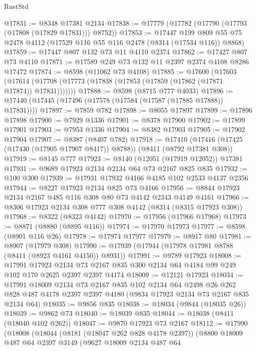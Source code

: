 \begin{lexlean}{RustStd}
\begin{coremodule}
@17831 := @8348 @17381 @2134
@17838 := @17779 (@17782 (@17790 (@17793 (@17808 (@17829 @17831))) @8752))
@17853 := @17447
    @199
    @809
    @55
    @75
    @2478
    @4112
    (@17529 @116 @55 @116 @2478 (@8314 (@17534 @116)) @8868)
@17859 := @17447 @807 @132 @73 @11 @4110 @2374
@17862 := @17427 @807 @73 @4110
@17871 := @17589 @249 @73 @132 @11 @2397 @2374 @4108 @8286 @17472
@17874 := @8598 (@11062 @73 @4108)
@17885 := @17600
    (@17603 (@17614 (@17708 (@17773 (@17838 (@17853 (@17859 (@17862 (@17871 @17874)) @17831)))))))
@17888 := @8598 (@8715 @777 @4033)
@17896 := @17440 (@17445 (@17496 (@17578 (@17584 (@17587 (@17885 @17888)) @17831))))
@17897 := @7859 @782
@17898 := @8055 @17897
@17899 := @17896 @17898
@17900 := @7929 @1336
@17901 := @8378 @17900
@17902 := @17899 @17901
@17903 := @7953 @1336
@17904 := @8382 @17903
@17905 := @17902 @17904
@17907 := @8387 (@8407 @782)
@17918 := @17410 (@17416 (@17425 (@17430 (@17905 @17907 @8417)) @8788)) (@8411 (@8792 @17381 @308))
@17919 := @8145 @777
@17923 := @8140 (@12051 (@17919 @12052)) @17381
@17931 := @9689 @17923 @2134 @2134 @64 @73 @2167 @825 @835
@17932 := @100 @300
@17939 := @17931 @17932 @4166 @4185 @102 @2533 @4137 @2356
@17944 := @8227 @17923 @2134 @825 @73 @4166
@17956 := @8844 @17923 @2134 @2167 @485 @116 @308 @80 @73 @4142 @2343 @4149 @4161
@17966 := @8306 @17923 @2134 @308 @777 @308 @4142 (@8314 (@8315 @17923 @308))
@17968 := @8322 (@8323 @4142)
@17970 := @17956 (@17966 @17968)
@17973 := @8871 (@8880 (@8895 @116))
@17974 := @17970 @17973
@17977 := @8598 (@8901 @116 @26)
@17978 := @17974 @17977
@17979 := @8917 @80
@17981 := @8907 (@17979 @308)
@17990 := @17939 (@17944 (@17978 @17981 @8788 (@8411 (@8923 @4161 @4150)) @8931))
@17991 := @9789 @17923
@18008 := @17991
    @17923
    @2134
    @73
    @2167
    @835
    @300
    @2134
    @64
    @4184
    @99
    @249
    @102
    @170
    @2625
    @2397
    @2397
    @4174
@18009 := @12121 @17923
@18034 := @17991
    @18009
    @2134
    @73
    @2167
    @835
    @102
    @2134
    @64
    @2498
    @26
    @262
    @828
    @487
    @4178
    @2397
    @2397
    @4180
    (@9834 @17923 @2134 @73 @2167 @835 @2134 @64)
@18035 := @9856 @835
@18038 := @18034 (@9844 (@18035 @26))
@18039 := @9862 @73
@18040 := @18039 @835
@18044 := @18038 (@8411 (@18040 @102 @262))
@18047 := @9870 @17923 @73 @2167
@18112 := @17990
    (@18008
      (@18044
        (@8181 (@18047 @262 @828 @4178 @2397))
        (@8800
          @18009
          @487
          @64
          @2397
          @3149
          (@9627
            @18009
            @2134
            @487
            @64

\end{coremodule}
\end{lexlean}
